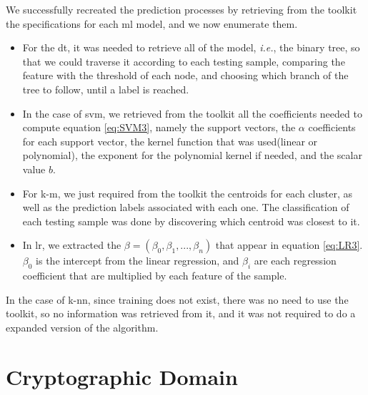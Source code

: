 We successfully recreated the prediction processes by retrieving from the toolkit the specifications for each \ac{ml} model, and we now enumerate them.

\begin{itemize}
	\setlength\itemsep{1em}
    \item For the \ac{dt}, it was needed to retrieve all of the model, \textit{i.e.}, the binary tree, so that we could traverse it according to each testing sample, comparing the feature with the threshold of each node, and choosing which branch of the tree to follow, until a label is reached. 

    \item In the case of \ac{svm}, we retrieved from the toolkit all the coefficients needed to compute equation \ref{eq:SVM3}, namely the support vectors, the $\alpha$ coefficients for each support vector, the kernel function that was used(linear or polynomial), the exponent for the polynomial kernel if needed, and the scalar value $b$.

    \item For \ac{k-m}, we just required from the toolkit the centroids for each cluster, as well as the prediction labels associated with each one. The classification of each testing sample was done by discovering which centroid was closest to it.

    \item In \ac{lr}, we extracted the $\beta=(\beta_0,\beta_1,...,\beta_n)$ that appear in equation \ref{eq:LR3}. $\beta_0$ is the intercept from the linear regression, and $\beta_i$ are each regression coefficient that are multiplied by each feature of the sample.

\end{itemize}

In the case of \ac{k-nn}, since training does not exist, there was no need to use the toolkit, so no information was retrieved from it, and it was not required to do a expanded version of the algorithm.



\section{Cryptographic Domain}
\label{sec:CryptoDomainImplementation}

